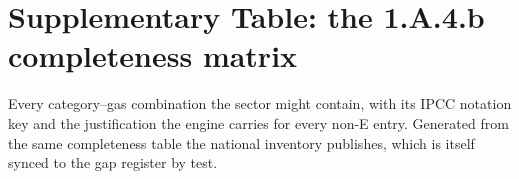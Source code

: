 \section{Supplementary Table: the 1.A.4.b completeness matrix}
\label{app:completeness}

Every category--gas combination the sector might contain, with its IPCC
notation key and the justification the engine carries for every non-E entry.
Generated from the same completeness table the national inventory publishes,
which is itself synced to the gap register by test.

